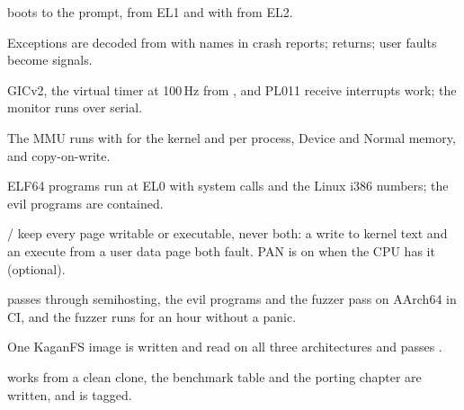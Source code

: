 \documentclass[11pt,a4paper]{article}
\begin{document}
\begin{milestonebox}
\begin{checklist}
  \item {} boots to the  prompt, from EL1 and with  from EL2.
  \item Exceptions are decoded from  with names in crash reports;  returns; user faults become signals.
  \item GICv2, the virtual timer at 100\,Hz from , and PL011 receive interrupts work; the monitor runs over serial.
  \item The MMU runs with  for the kernel and  per process, Device and Normal memory, and copy-on-write.
  \item ELF64 programs run at EL0 with  system calls and the Linux i386 numbers; the evil programs are contained.
  \item {}/ keep every page writable or executable, never both: a write to kernel text and an execute from a user data page both fault. PAN is on when the CPU has it (optional).
  \item {} passes through semihosting, the evil programs and the fuzzer pass on AArch64 in CI, and the fuzzer runs for an hour without a panic.
  \item One KaganFS image is written and read on all three architectures and passes .
  \item {} works from a clean clone, the benchmark table and the porting chapter are written, and  is tagged.
\end{checklist}
\end{milestonebox}
\end{document}
